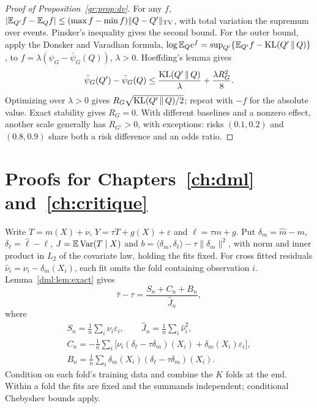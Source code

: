 \begin{proof}[Proof of Proposition~\ref{gr:prop:dv}]
For any $f$, $|\mathbb{E}_{Q'}f-\mathbb{E}_Qf|\le(\max f-\min f)\|Q-Q'\|_{\mathrm{TV}}$, with total variation the supremum over events. Pinsker's inequality gives the second bound. For the outer bound, apply the Donsker and Varadhan formula, $\log\mathbb{E}_Qe^f=\sup_{Q'}\{\mathbb{E}_{Q'}f-\mathrm{KL}(Q'\,\|\,Q)\}$, to $f=\lambda(\psi_G-\bar\psi_G(Q))$, $\lambda>0$. Hoeffding's lemma gives
\[
\bar\psi_G(Q')-\bar\psi_G(Q)\le\frac{\mathrm{KL}(Q'\,\|\,Q)}{\lambda}+\frac{\lambda R_G^2}{8}.
\]
Optimizing over $\lambda>0$ gives $R_G\sqrt{\mathrm{KL}(Q'\,\|\,Q)/2}$; repeat with $-f$ for the absolute value. Exact stability gives $R_G=0$. With different baselines and a nonzero effect, another scale generally has $R_{G'}>0$, with exceptions: risks $(0.1,0.2)$ and $(0.8,0.9)$ share both a risk difference and an odds ratio.
\end{proof}

\section{Proofs for Chapters~\ref{ch:dml} and~\ref{ch:critique}}\label{app:dmlproofs}

Write $T=m(X)+\nu$, $Y=\tau T+g(X)+\varepsilon$ and $\ell=\tau m+g$. Put $\delta_m=\hat m-m$, $\delta_\ell=\hat\ell-\ell$, $J=\mathbb{E}\,\mathrm{Var}(T\mid X)$ and $b=\langle\delta_m,\delta_\ell\rangle-\tau\|\delta_m\|^2$, with norm and inner product in $L_2$ of the covariate law, holding the fits fixed. For cross fitted residuals $\hat\nu_i=\nu_i-\delta_m(X_i)$, each fit omits the fold containing observation $i$. Lemma~\ref{dml:lem:exact} gives
\[
\hat\tau-\tau=\frac{S_n+C_n+B_n}{\hat J_n},
\]
where
\[
\begin{gathered}
S_n=\frac1n\sum_i\nu_i\varepsilon_i,\qquad \hat J_n=\frac1n\sum_i\hat\nu_i^2,\\
C_n=-\frac1n\sum_i\bigl[\nu_i(\delta_\ell-\tau\delta_m)(X_i)+\delta_m(X_i)\varepsilon_i\bigr],\\
B_n=\frac1n\sum_i\delta_m(X_i)(\delta_\ell-\tau\delta_m)(X_i).
\end{gathered}
\]
Condition on each fold's training data and combine the $K$ folds at the end. Within a fold the fits are fixed and the summands independent; conditional Chebyshev bounds apply.

